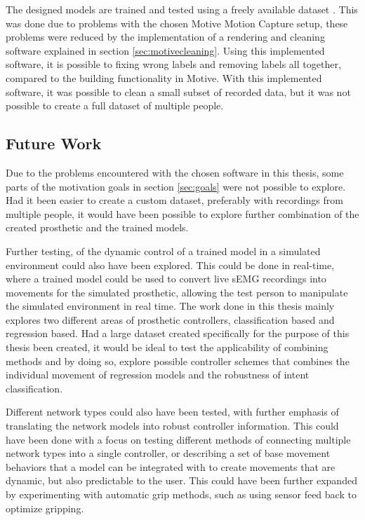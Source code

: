 \documentclass[../main.tex]{subfiles}
\begin{document}
The designed models are trained and tested using a freely available dataset \cite{kinmusdataset}.
This was done due to problems with the chosen Motive Motion Capture setup, these problems were reduced by the implementation of a rendering and cleaning software explained in section \ref{sec:motivecleaning}.
Using this implemented software, it is possible to fixing wrong labels and removing labels all together, compared to the building functionality in Motive.
With this implemented software, it was possible to clean a small subset of recorded data, but it was not possible to create a full dataset of multiple people.





\newpage
\subsection{Future Work}

Due to the problems encountered with the chosen software in this thesis, some parts of the motivation goals in section \ref{sec:goals} were not possible to explore.
Had it been easier to create a custom dataset, preferably with recordings from multiple people, it would have been possible to explore further combination of the created prosthetic and the trained models.

Further testing, of the dynamic control of a trained model in a simulated environment could also have been explored.
This could be done in real-time, where a trained model could be used to convert live sEMG recordings into movements for the simulated prosthetic, allowing the test person to manipulate the simulated environment in real time.
The work done in this thesis mainly explores two different areas of prosthetic controllers, classification based and regression based.
Had a large dataset created specifically for the purpose of this thesis been created, it would be ideal to test the applicability of combining methods and by doing so, explore possible controller schemes that combines the individual movement of regression models and the robustness of intent classification.  

Different network types could also have been tested, with further emphasis of translating the network models into robust controller information.
This could have been done with a focus on testing different methods of connecting multiple network types into a single controller, or describing a set of base movement behaviors that a model can be integrated with to create movements that are dynamic, but also predictable to the user.  
This could have been further expanded by experimenting with automatic grip methods, such as using sensor feed back to optimize gripping. 

\end{document}
